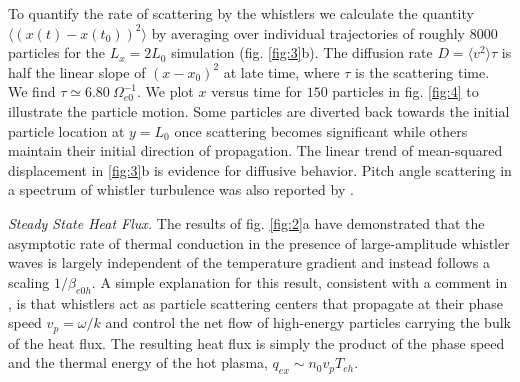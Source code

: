 \documentclass[%
 reprint,
superscriptaddress,
 amsmath,amssymb,
 aps,
]{revtex4-1}
\begin{document}
To quantify the rate of scattering by the whistlers we calculate the
quantity $\langle (x(t)-x(t_{0}))^{2}\rangle$ by averaging over
individual trajectories of roughly $8000$ particles for the
$L_{x}=2L_{0}$ simulation (fig. \ref{fig:3}b). The diffusion rate
$D=\langle v^2 \rangle \tau$ is half the linear slope of
$(x-x_{0})^{2}$ at late time, where $\tau$ is the scattering time. We
find $\tau \simeq 6.80 \: \Omega_{e0}^{-1}$. We plot $x$ versus time
for $150$ particles in fig. \ref{fig:4} to illustrate the particle
motion. Some particles are diverted back towards the initial particle
location at $y=L_{0}$ once scattering becomes significant while
others maintain their initial direction of propagation. The linear
trend of mean-squared displacement in \ref{fig:3}b is evidence for
diffusive behavior. Pitch angle scattering in a spectrum of whistler
turbulence was also reported by \cite{Keenan2016}.

\textit{Steady State Heat Flux.} The results of fig. \ref{fig:2}a have
demonstrated that the asymptotic rate of thermal conduction in the
presence of large-amplitude whistler waves is largely independent of
the temperature gradient and instead follows a scaling $1/\beta_{e0h}
$. A simple explanation for this result, consistent with a comment in \cite{Levinson1992}, is that whistlers act as particle
scattering centers that propagate at their phase speed
$v_{p}=\omega/k$ and control the net flow of high-energy particles
carrying the bulk of the heat flux. The resulting heat flux is simply
the product of the phase speed and the thermal energy of the hot
plasma, $q_{ex}\sim n_0v_{p}T_{eh}$.
\end{document}
